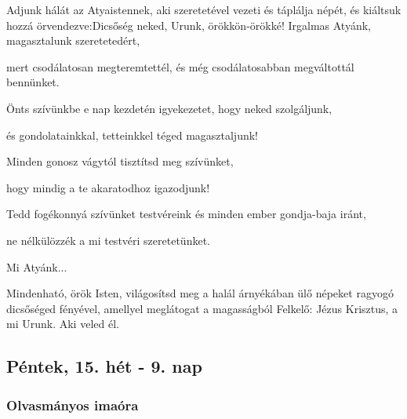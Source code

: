 \documentclass[twoside]{article}
\begin{document}


\begin{preces}{Adjunk hálát az Atyaistennek, aki szeretetével vezeti és táplálja népét, és kiáltsuk hozzá örvendezve:}{Dicsőség neked, Urunk, örökkön-örökké!}
  Irgalmas Atyánk, magasztalunk szeretetedért,

  \reddash mert csodálatosan megteremtettél, és még csodálatosabban megváltottál bennünket.

  Önts szívünkbe e nap kezdetén igyekezetet, hogy neked szolgáljunk,

  \reddash és gondolatainkkal, tetteinkkel téged magasztaljunk!

  Minden gonosz vágytól tisztítsd meg szívünket,

  \reddash hogy mindig a te akaratodhoz igazodjunk!

  Tedd fogékonnyá szívünket testvéreink és minden ember gondja-baja iránt,

  \reddash ne nélkülözzék a mi testvéri szeretetünket.
\end{preces}
Mi Atyánk...

Mindenható, örök Isten, világosítsd meg a halál árnyékában ülő népeket ragyogó dicsőséged fényével, amellyel meglátogat a magasságból Felkelő: Jézus Krisztus, a mi Urunk. Aki veled él.


\subsection*{Péntek, 15. hét - 9. nap}


\subsubsection*{Olvasmányos imaóra}


\end{document}
